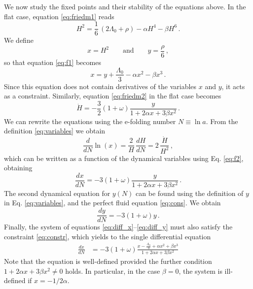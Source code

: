 \documentclass[aps,prd,preprint,nofootinbib]{revtex4-1}
\begin{document}
We now study the fixed points and their stability of the equations above. In the flat case, equation \eqref{eq:friedm1} reads
\begin{equation}
H^2= \frac{1}{6}\, \left(2\Lambda_0 + \rho\right) - \alpha H^4 - \beta H^6\,.\label{eq:f1}
\end{equation}
We define 
\begin{equation}
x = H^2 \qquad \text{and} \qquad y = \frac{\rho}{6}\,,\label{eq:variables}
\end{equation}
so that equation \eqref{eq:f1} becomes
\begin{equation}
x = y + \frac{\Lambda_0}{3} -\alpha x^2 -\beta x^3\,.\label{eq:constr}
\end{equation}
Since this equation does not contain derivatives of the variables $x$ and $y$, it acts as a constraint. Similarly,  equation \eqref{eq:friedm2} in the flat case becomes
\begin{equation}
\dot{H} = -\frac{3}{2}(1+\omega)\frac{y}{1+2\alpha x+3\beta x^2}\,.\label{eq:f2}
\end{equation}
We can rewrite the equations using the e-folding number $N\equiv \ln a$. From the definition \eqref{eq:variables} we obtain
\begin{equation}
\frac{d}{dN} \ln(x) = \frac2H\, \frac{d H}{dN} = 2\, \frac{\dot{H}}{H^2}\,,
\end{equation}
which can be written as a function of the dynamical variables using Eq. \eqref{eq:f2}, obtaining
\begin{equation}
\frac{d x}{dN} = -3(1+\omega)\frac{y}{1+2\alpha x+3 \beta x^2}\,. \label{eq:diff_x}
\end{equation}
The second dynamical equation for $y(N)$ can be found using the definition of $y$ in Eq. \eqref{eq:variables}, and the perfect fluid equation \eqref{eq:cons}. We obtain
\begin{equation}
\frac{dy}{dN} = -3(1+\omega)y\,.\label{eq:diff_y}
\end{equation}
Finally, the system of equations \eqref{eq:diff_x}--\eqref{eq:diff_y} must also satisfy the constraint \eqref{eq:constr}, which yields to the single differential equation
\begin{align}
\frac{d x}{dN} &= -3(1+\omega)\frac{x - \frac{\Lambda_0}{3} +\alpha x^2 +\beta x^3}{1+2 \alpha x+3 \beta x^2}\label{eq:sys1}
\end{align}
Note that the equation is well-defined provided the further condition $
1+2\alpha x+3\beta x^2\neq 0$ holds. In particular, in the case $\beta=0$, the system is ill-defined if $x=-1/2\alpha$.
\end{document}
